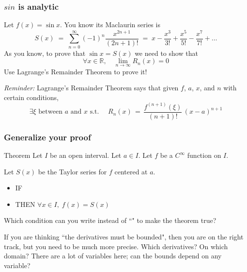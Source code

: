 \documentclass[14pt]{beamer}
\begin{document}
\begin{frame}
	\fontsize{13}{13}\selectfont
	\frametitle{$sin$ is analytic}

	Let $\displaystyle f(x) = \sin x$. You know its Maclaurin series is
	\[
		S(x) \; =\; \sum_{n=0}^{\infty}(-1)^{n}\frac{x^{2n+1}}{(2n+1)!}\; = \; x - \frac{x^{3}}{3!}
		+ \frac{x^{5}}{5!}- \frac{x^{7}}{7!}+ \ldots
	\]
	As you know, to prove that $\displaystyle \sin x = S(x)$ we need to show that
	\[
		\forall x \in \mathbb{R}, \quad \lim_{n \to \infty}R_{n}(x) = 0
	\]
	Use Lagrange's Remainder Theorem to prove it!

	\hrulefill

	\emph{Reminder:} Lagrange's Remainder Theorem says that given $f$, $a$, $x$,
	and $n$ with certain conditions,
	\begin{equation*}
		\exists \xi \text{ between $a$ and $x$ s.t. }\quad R_{n}(x) \, = \, \frac{f^{(n+1)}(\xi)}{(n+1)!}
		\, (x-a)^{n+1}
	\end{equation*}
\end{frame}

\begin{frame}[t]
	\fontsize{13}{13}\selectfont
	\frametitle{Generalize your proof}

	\begin{block}{Theorem}
		Let $I$ be an open interval. Let $a \in I$. Let $f$ be a $C^{\infty}$ function
		on $I$.

		Let $S(x)$ be the Taylor series for $f$ centered at $a$.

		\begin{itemize}
			\item IF 

			\item THEN $\displaystyle \forall x \in I, \; f(x) = S(x)$
		\end{itemize}
	\end{block}
	\vspace{.2cm}

	Which condition can you write instead of ``" to make the theorem
	true?

	\vspace{.2cm}

	If you are thinking ``the derivatives must be bounded", then you are on the right
	track, but you need to be much more precise. Which derivatives? On which
	domain? There are a lot of variables here; can the bounds depend on any
	variable?
\end{frame}
\end{document}
